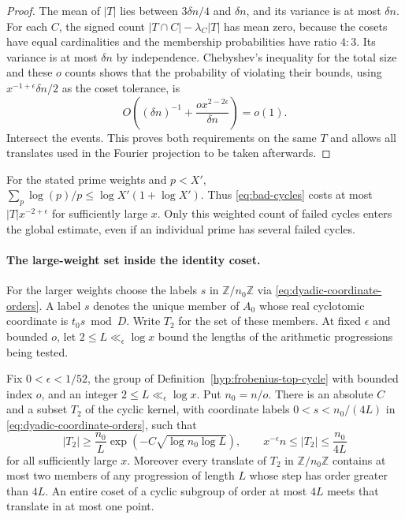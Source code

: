 \begin{proof}
The mean of \(|T|\) lies between \(3\delta n/4\)
and \(\delta n\), and its variance is at most \(\delta n\).
For each \(C\), the signed count
\(|T\cap C|-\lambda_C|T|\) has mean zero, because the
cosets have equal cardinalities and the membership
probabilities have ratio \(4:3\). Its variance is at most
\(\delta n\) by independence. Chebyshev's inequality for
the total size and these \(o\) counts shows that the
probability of violating their bounds, using
\(x^{-1+\epsilon}\delta n/2\) as the coset tolerance, is
\[
 O\!\left((\delta n)^{-1}
             +\frac{o x^{2-2\epsilon}}{\delta n}\right)=o(1).
\]
Intersect the events. This proves both requirements on the
same \(T\) and allows all translates used in the Fourier
projection to be taken afterwards.
\end{proof}

For the
stated prime weights and \(p<X'\),
\(\sum_p\log(p)/p\le\log X'(1+\log X')\).
Thus \eqref{eq:bad-cycles} costs at most
\(|T|x^{-2+\epsilon}\) for sufficiently large \(x\).
Only this weighted count of failed cycles enters the global
estimate, even if an individual prime has several failed
cycles.

\paragraph{The large-weight set inside the identity coset.}
For the larger weights choose the labels \(s\) in
\(\mathbb Z/n_0\mathbb Z\) via \eqref{eq:dyadic-coordinate-orders}.
A label \(s\) denotes the unique member of \(A_0\) whose real
cyclotomic coordinate is \(t_0 s\bmod D\). Write \(T_2\) for the set
of these members. At fixed
\(\epsilon\) and bounded \(o\), let \(2\le L\ll_\epsilon\log x\)
bound the lengths of the arithmetic progressions being tested.

\begin{lemma}\label{lem:second-set-progressions}
Fix \(0<\epsilon<1/52\), the group of
Definition~\ref{hyp:frobenius-top-cycle} with bounded index \(o\),
and an integer \(2\le L\ll_\epsilon\log x\). Put \(n_0=n/o\).
There is an absolute \(C\) and a subset \(T_2\) of the cyclic
kernel, with coordinate labels \(0<s<n_0/(4L)\) in
\eqref{eq:dyadic-coordinate-orders}, such that
\[
 |T_2|\ge \frac{n_0}{L}\exp(-C\sqrt{\log n_0\log L}),
 \qquad x^{-\epsilon}n\le |T_2|\le\frac{n_0}{4L}
\]
for all sufficiently large \(x\). Moreover every translate
of \(T_2\) in \(\mathbb Z/n_0\mathbb Z\) contains at most two
members of any progression of length \(L\) whose step has
order greater than \(4L\). An entire coset of a cyclic
subgroup of order at most \(4L\) meets that translate in at
most one point.
\end{lemma}

